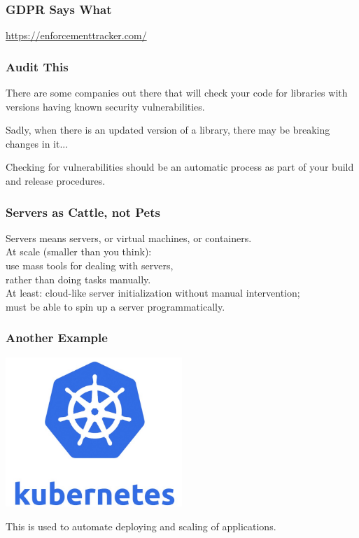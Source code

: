 \begin{frame}
\frametitle{GDPR Says What}

\url{https://enforcementtracker.com/}

\end{frame}


\begin{frame}
\frametitle{Audit This}

There are some companies out there that will check your code for libraries with versions having known security vulnerabilities.

Sadly, when there is an updated version of a library, there may be breaking changes in it...

Checking for vulnerabilities should be an automatic process as part of your build and release procedures. 

\end{frame}



\begin{frame}
\frametitle{Servers as Cattle, not Pets}

\large
\begin{changemargin}{2cm}
Servers means servers, or virtual machines, or containers.\\[1em]

At scale (smaller than you think):\\
use mass tools for dealing with servers, \\
rather than doing tasks manually. \\[1em]

At least: cloud-like server initialization without manual intervention;\\
must be able to spin up a server programmatically.
\end{changemargin}

\end{frame}



\begin{frame}
\frametitle{Another Example}

\begin{center}
	\includegraphics[width=0.5\textwidth]{images/Kubernetes.jpg}
\end{center}

This is used to automate deploying and scaling of applications.

\end{frame}



